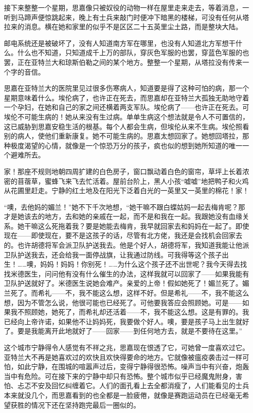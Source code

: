 \par 接下来整整一个星期，思嘉像只被奴役的动物一样在屋里走来走去，等着消息，一听到马蹄声便惊跳起来，晚上有士兵来敲门时便冲下暗黑的楼梯，可没有任何从塔拉来的消息。横在她和家里的似乎不是区区二十五英里尘土路，而是整块大陆。
\par 邮电系统还是被破坏了，没有人知道南方军在哪里，也没有人知道北方军想干什么。什么也不知道，只知道成千上万的部队，穿灰色军服的也罢，穿蓝色军服的也罢，正在亚特兰大和琼斯伯勒之间的某个地方。整整一个星期，从塔拉没有传来一个字的音信。
\par 思嘉在亚特兰大的医院里见过很多伤寒病人，知道要是得了这种可怕的病，那一个星期意味着什么。埃伦病了，也许正在死去，而思嘉却在亚特兰大孤独无助地守着一个孕妇，在她和自己的家之间还横着两支军队。埃伦病了——也许正在死去。可埃伦不可能生病的！她从来没有生过病。单单生病这个想法就是令人不可置信的，这已威胁到思嘉安稳生活的根基。每个人都会生病，但埃伦从来不生病。埃伦照看别的病人，使他们重新康复。她不可能生病的。思嘉太想回家了。她想回塔拉，那种极度渴望的心情，就像是一个惊恐万分的孩子，疯也似的想到她所知道的唯一一个避难所去。
\par 家！那座不规则地朝四周扩建的白色房子，窗口飘动着白色的窗帘，草坪上长着浓密的苜蓿草，蜜蜂飞来飞去忙活着。屋前台阶上，黑人小孩“嘘嘘”地把鸭子和火鸡从花圃里赶走。宁静的红土地及在阳光下泛着白光的一英里又一英里的棉花！家！
\par “噢，去他妈的媚兰！”她不下千次地想，“她干嘛不跟白蝶姑妈一起去梅肯呢？那才是她该去的地方，去和她的亲戚在一起，而不是和我在一起。我跟她没有血缘关系。她干嘛这么死拖着我？要是她能去梅肯，我早就回家去和妈妈在一起了。即使现在——即使现在，要不是这孩子的话，尽管有北方佬，我还是会找机会回家去的。也许胡德将军会派卫队护送我去。他是个好人，胡德将军，我知道我能让他派卫队护送我去，还会给我一面停战旗，让我通过防线。可我得等这个孩子出生！……噢，妈妈！妈妈！你别死！……为什么这个孩子还不出世呢？我今天得去找找米德医生，问问他有没有什么催生的办法，这样我就可以回家了——如果我能有卫队护送就好了。米德医生说她会难产。亲爱的上帝！假如她死了！媚兰死了。媚兰死了。而希礼——不，我不能这么想，这样不好。但是希礼——不，我不能这么想，因为不管怎么说，他很可能也已经死了。可他要我答应会照顾她。可是——如果我不照顾她，她死了，而希礼却还活着——不，我不能这么想。这是有罪的。我已经向上帝许诺，如果他不让妈妈死，我要做个好人。噢，要是孩子马上出生就好了。要是我能离开此地就好了——回家——到任何地方去，就是不要待在这里。”
\par 这个城市宁静得令人感觉有不祥之兆，思嘉现在恨透了它，可她曾一度喜欢过它。亚特兰大不再是她喜欢过的欢快且欢快得要命的地方。它就像被瘟疫袭击过一样可怕，如此宁静，在围城的喧嚣声过后，变得宁静得很恐怖。噪声当中有兴奋，炮轰当中有危险。可在接下来的宁静中却只有恐怖。整个城市似乎已经魔鬼附身，害怕、忐忑不安及回忆纠缠着它。人们的面孔看上去全都消瘦了，人们能看见的士兵本来就没几个，而思嘉看到的也全都是一脸疲倦，就像是赛跑运动员在已经毫无希望获胜的情况下还在坚持跑完最后一圈似的。
